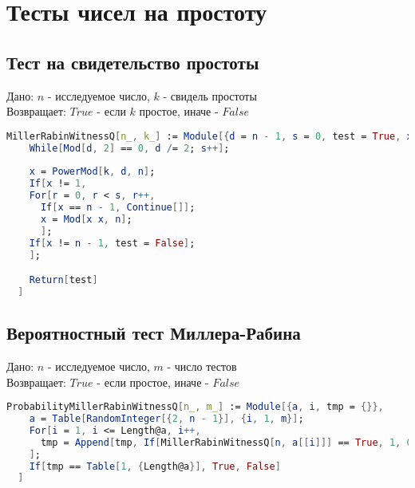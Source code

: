 
\chapter{Тесты чисел на простоту}

\section{Тест на свидетельство простоты}

  Дано: {$n$} - исследуемое число, {$k$} - свидель простоты \\
  Возвращает: {$True$} - если {$k$} простое, иначе - {$False$}

\begin{lstlisting}[language=Mathematica,caption={Тест Миллера-Рабина}]
  MillerRabinWitnessQ[n_, k_] := Module[{d = n - 1, s = 0, test = True, x, a, r},
    While[Mod[d, 2] == 0, d /= 2; s++];
    
    x = PowerMod[k, d, n];
    If[x != 1,
    For[r = 0, r < s, r++,
      If[x == n - 1, Continue[]];
      x = Mod[x x, n];
      ];
    If[x != n - 1, test = False];
    ];

    Return[test]
  ]
\end{lstlisting}

\section{Вероятностный тест Миллера-Рабина}

  Дано: {$n$} - исследуемое число, {$m$} - число тестов \\
  Возвращает: {$True$} - если простое, иначе - {$False$}

\begin{lstlisting}[language=Mathematica,caption={Вероятностный тест Миллера-Рабина}]
  ProbabilityMillerRabinWitnessQ[n_, m_] := Module[{a, i, tmp = {}},
    a = Table[RandomInteger[{2, n - 1}], {i, 1, m}];
    For[i = 1, i <= Length@a, i++,
      tmp = Append[tmp, If[MillerRabinWitnessQ[n, a[[i]]] == True, 1, 0]];
    ];
    If[tmp == Table[1, {Length@a}], True, False]
  ] 
\end{lstlisting}
